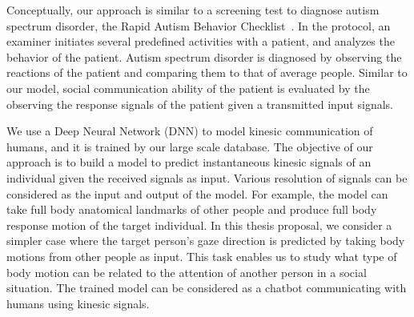 Conceptually, our approach is similar to a screening test to diagnose autism spectrum disorder, the Rapid Autism Behavior Checklist~\cite{krug1980behavior, mathys2013beyond}. In the protocol, an examiner initiates several predefined activities with a patient, and analyzes the behavior of the patient. Autism spectrum disorder is diagnosed by observing the reactions of the patient and comparing them to that of average people. Similar to our model, social communication ability of the patient is evaluated by the observing the response signals of the patient given a transmitted input signals. 

We use a Deep Neural Network (DNN) to model kinesic communication of humans, and it is trained by our large scale database. The objective of our approach is to build a model to predict instantaneous kinesic signals of an individual given the received signals as input. Various resolution of signals can be considered as the input and output of the model. For example, the model can take full body anatomical landmarks of other people and produce full body response motion of the target individual. In this thesis proposal, we consider a simpler case where the target person's gaze direction is predicted by taking body motions from other people as input. This task enables us to study what type of body motion can be related to the attention of another person in a social situation. The trained model can be considered as a chatbot communicating with humans using kinesic signals. 

